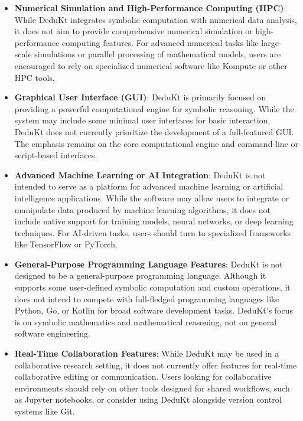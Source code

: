 \begin{itemize}
    \item \textbf{Numerical Simulation and High-Performance Computing (HPC)}: While DeduKt integrates symbolic computation with numerical data analysis, it does not aim to provide comprehensive numerical simulation or high-performance computing features.
    For advanced numerical tasks like large-scale simulations or parallel processing of mathematical models, users are encouraged to rely on specialized numerical software like Kompute or other HPC tools.

    \item \textbf{Graphical User Interface (GUI)}: DeduKt is primarily focused on providing a powerful computational engine for symbolic reasoning.
    While the system may include some minimal user interfaces for basic interaction, DeduKt does not currently prioritize the development of a full-featured GUI.
    The emphasis remains on the core computational engine and command-line or script-based interfaces.

    \item \textbf{Advanced Machine Learning or AI Integration}: DeduKt is not intended to serve as a platform for advanced machine learning or artificial intelligence applications.
    While the software may allow users to integrate or manipulate data produced by machine learning algorithms, it does not include native support for training models, neural networks, or deep learning techniques.
    For AI-driven tasks, users should turn to specialized frameworks like TensorFlow or PyTorch.

    \item \textbf{General-Purpose Programming Language Features}: DeduKt is not designed to be a general-purpose programming language.
    Although it supports some user-defined symbolic computation and custom operations, it does not intend to compete with full-fledged programming languages like Python, Go, or Kotlin for broad software development tasks.
    DeduKt’s focus is on symbolic mathematics and mathematical reasoning, not on general software engineering.

    \item \textbf{Real-Time Collaboration Features}: While DeduKt may be used in a collaborative research setting, it does not currently offer features for real-time collaborative editing or communication.
    Users looking for collaborative environments should rely on other tools designed for shared workflows, such as Jupyter notebooks, or consider using DeduKt alongside version control systems like Git.


\end{itemize}
